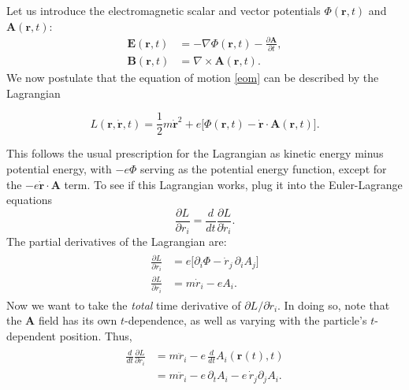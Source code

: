 \documentclass[pra,12pt]{revtex4}
\begin{document}
Let us introduce the electromagnetic scalar and vector potentials
$\Phi(\mathbf{r},t)$ and $\mathbf{A}(\mathbf{r},t)$:
\begin{align}
  \mathbf{E}(\mathbf{r},t) &= - \nabla \Phi(\mathbf{r},t) - \frac{\partial\mathbf{A}}{\partial t}, \\
  \mathbf{B}(\mathbf{r},t) &= \nabla \times \mathbf{A}(\mathbf{r},t).
  \label{Bfield}
\end{align}
We now postulate that the equation of motion \eqref{eom} can be
described by the Lagrangian
\begin{framed}
\begin{equation}
  L(\mathbf{r},\dot{\mathbf{r}},t) = \frac{1}{2}m\dot{\mathbf{r}}^2
  + e \Big[\Phi(\mathbf{r},t) - \dot{\mathbf{r}} \cdot \mathbf{A}(\mathbf{r},t)
    \Big].
  \label{Lag}
\end{equation}
\end{framed}
\vskip -0.15in
\noindent
This follows the usual prescription for the Lagrangian as kinetic
energy minus potential energy, with $-e\Phi$ serving as the potential
energy function, except for the $-e\dot{\mathbf{r}} \cdot \mathbf{A}$
term.  To see if this Lagrangian works, plug it into the
Euler-Lagrange equations
\begin{equation}
  \frac{\partial L}{\partial r_i} = \frac{d}{dt}
  \frac{\partial L}{\partial \dot{r}_i}.
  \label{EulerLagrange}
\end{equation}
The partial derivatives of the Lagrangian are:
\begin{align}
  \begin{aligned}
    \frac{\partial L}{\partial r_i} &=
    e\Big[\partial_i \Phi - \dot{r}_j \,\partial_i A_j \Big]\\
    \frac{\partial L}{\partial \dot{r}_i} &= m\dot{r}_i - e A_i.
  \end{aligned}
\end{align}
Now we want to take the \textit{total} time derivative of $\partial L
/\partial \dot{r}_i$.  In doing so, note that the $\mathbf{A}$ field
has its own $t$-dependence, as well as varying with the particle's
$t$-dependent position.  Thus,
\begin{align}
  \begin{aligned}
    \frac{d}{dt} \frac{\partial L}{\partial \dot{r}_i}
    &= m\ddot{r}_i - e\, \frac{d}{dt} A_i(\mathbf{r}(t),t) \\
    &= m\ddot{r}_i - e\, \partial_t A_i
    - e\, \dot{r}_j \partial_j A_i.
  \end{aligned}
\end{align}
\end{document}
